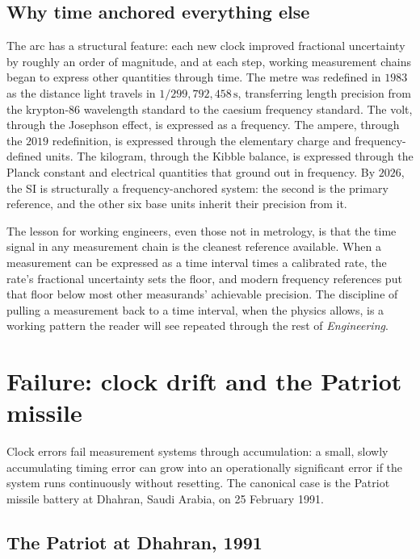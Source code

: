 \subsection{Why time anchored everything else}

The arc has a structural feature: each new clock improved
fractional uncertainty by roughly an order of magnitude, and at
each step, working measurement chains began to express other
quantities through time. The metre was redefined in $1983$ as
the distance light travels in $1/299{,}792{,}458 \,\si{\second}$,
transferring length precision from the krypton-86 wavelength
standard to the caesium frequency standard. The volt, through the
Josephson effect, is expressed as a frequency. The ampere, through
the $2019$ redefinition, is expressed through the elementary
charge and frequency-defined units. The kilogram, through the
Kibble balance, is expressed through the Planck constant and
electrical quantities that ground out in frequency. By $2026$, the
SI is structurally a frequency-anchored system: the second is the
primary reference, and the other six base units inherit their
precision from it.

The lesson for working engineers, even those not in metrology,
is that the time signal in any measurement chain is the cleanest
reference available. When a measurement can be expressed as a
time interval times a calibrated rate, the rate's fractional
uncertainty sets the floor, and modern frequency references put
that floor below most other measurands' achievable precision. The
discipline of pulling a measurement back to a time interval, when
the physics allows, is a working pattern the reader will see
repeated through the rest of \emph{Engineering}.

\section{Failure: clock drift and the Patriot missile}

Clock errors fail measurement systems through accumulation: a
small, slowly accumulating timing error can grow into an
operationally significant error if the system runs continuously
without resetting. The canonical case is the Patriot missile
battery at Dhahran, Saudi Arabia, on 25 February 1991.

\subsection{The Patriot at Dhahran, 1991}

